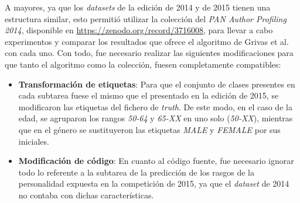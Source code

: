 {\bigskip
\begin{table}[H]
	\centering
	\caption{Resultados de las pruebas realizadas con el algoritmo de Grivas et al. \cite{grivas2015author}}
	\label{tab:pruebas_grivas}
\end{table}

\bigskip
A mayores, ya que los \textit{datasets} de la edición de 2014 y de 2015 tienen una estructura similar, esto permitió utilizar la colección
del \textit{PAN Author Profiling 2014}, disponible en \url{https://zenodo.org/record/3716008}, para llevar a cabo experimentos y comparar los resultados que ofrece el algoritmo
de Grivas et al. \cite{grivas2015author} con cada uno. Con todo, fue necesario realizar las siguientes modificaciones para que tanto el algoritmo
como la colección, fuesen completamente compatibles:

\begin{itemize}
	\item \textbf{Transformación de etiquetas}: Para que el conjunto de clases presentes en cada subtarea fuese el mismo que el presentado en la edición de 2015, se modificaron
	      las etiquetas del fichero de \textit{truth}. De este modo, en el caso de la edad, se agruparon los rangos \textit{50-64} y \textit{65-XX} en uno solo (\textit{50-XX}), mientras que en el género se sustituyeron
	      las etiquetas \textit{MALE} y \textit{FEMALE} por sus iniciales.
	\item \textbf{Modificación de código}: En cuanto al código fuente, fue necesario ignorar todo lo referente a la subtarea de la predicción de los rasgos de la personalidad
	      expuesta en la competición de 2015, ya que el \textit{dataset} de 2014 no contaba con dichas características.
\end{itemize}

}
